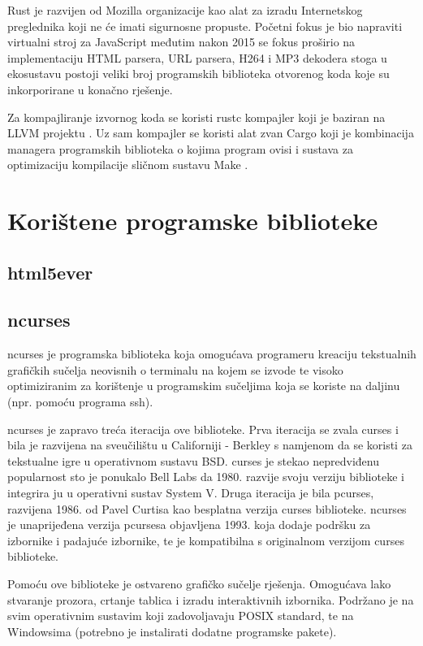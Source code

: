 \documentclass[times, utf8, zavrsni]{fer}
\begin{document}
Rust je razvijen od Mozilla organizacije kao alat za izradu Internetskog
preglednika koji ne će imati sigurnosne propuste. Početni fokus je bio
napraviti virtualni stroj za JavaScript međutim nakon 2015 se fokus proširio na
implementaciju HTML parsera, URL parsera, H264 i MP3 dekodera stoga u ekosustavu
postoji veliki broj programskih biblioteka otvorenog koda koje su inkorporirane
u konačno rješenje.

Za kompajliranje izvornog koda se koristi rustc kompajler koji je baziran na
LLVM projektu \cite{llvm_page}. Uz sam kompajler se koristi alat zvan
Cargo \cite{cargo_documentation}
koji je kombinacija managera programskih biblioteka o kojima program ovisi i
sustava za optimizaciju kompilacije sličnom sustavu
Make \cite{make_documentation}.

\section{Korištene programske biblioteke}

\subsection{html5ever}

\subsection{ncurses}

ncurses \cite{ncurses_documentation} je programska biblioteka koja omogućava
programeru kreaciju
tekstualnih grafičkih sučelja neovisnih o terminalu na kojem se izvode te
visoko optimiziranim za korištenje u programskim sučeljima koja se koriste na
daljinu (npr. pomoću programa ssh).

ncurses je zapravo treća iteracija ove biblioteke. Prva iteracija se zvala
curses i bila je razvijena na sveučilištu u Californiji - Berkley s namjenom
da se koristi za tekstualne igre u operativnom sustavu BSD. curses je stekao
nepredviđenu popularnost sto je ponukalo Bell Labs da 1980. razvije svoju
verziju biblioteke i integrira ju u operativni sustav System V. Druga
iteracija je bila pcurses, razvijena 1986. od Pavel Curtisa kao besplatna
verzija curses biblioteke. ncurses je unaprijeđena verzija pcursesa objavljena
1993. koja dodaje podršku za izbornike i padajuće izbornike, te je kompatibilna
s originalnom verzijom curses biblioteke.

Pomoću ove biblioteke je ostvareno grafičko sučelje rješenja. Omogućava lako
stvaranje prozora, crtanje tablica i izradu interaktivnih izbornika. Podržano
je na svim operativnim sustavim koji zadovoljavaju POSIX standard, te na
Windowsima (potrebno je instalirati dodatne programske pakete).
\end{document}
